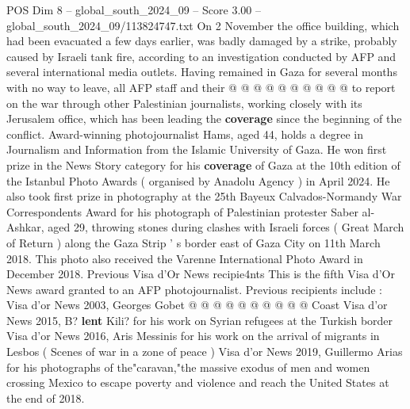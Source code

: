 \begin{textsample}{POS Dim 8 – global\_south\_2024\_09 – Score 3.00 – global\_south\_2024\_09/113824747.txt}
On 2 November the office building, which had been evacuated a few days earlier, was badly damaged by a strike, probably caused by Israeli tank fire, according to an investigation conducted by AFP and several international media outlets.
Having remained in Gaza for several months with no way to leave, all AFP staff and their @ @ @ @ @ @ @ @ @ @ to report on the war through other Palestinian journalists, working closely with its Jerusalem office, which has been leading the \textbf{coverage} since the beginning of the conflict.
Award-winning photojournalist Hams, aged 44, holds a degree in Journalism and Information from the Islamic University of Gaza.
He won first prize in the News Story category for his \textbf{coverage} of Gaza at the 10th edition of the Istanbul Photo Awards ( organised by Anadolu Agency ) in April 2024.
He also took first prize in photography at the 25th Bayeux Calvados-Normandy War Correspondents Award for his photograph of Palestinian protester Saber al-Ashkar, aged 29, throwing stones during clashes with Israeli forces ( Great March of Return ) along the Gaza Strip ' s border east of Gaza City on 11th March 2018.
This photo also received the Varenne International Photo Award in December 2018.
Previous Visa d'Or News recipie4nts This is the fifth Visa d'Or News award granted to an AFP photojournalist.
Previous recipients include : Visa d'or News 2003, Georges Gobet @ @ @ @ @ @ @ @ @ @ Coast Visa d'or News 2015, B? \textbf{lent} Kili? for his work on Syrian refugees at the Turkish border Visa d'or News 2016, Aris Messinis for his work on the arrival of migrants in Lesbos ( Scenes of war in a zone of peace ) Visa d'or News 2019, Guillermo Arias for his photographs of the"caravan,"the massive exodus of men and women crossing Mexico to escape poverty and violence and reach the United States at the end of 2018.

\end{textsample}
